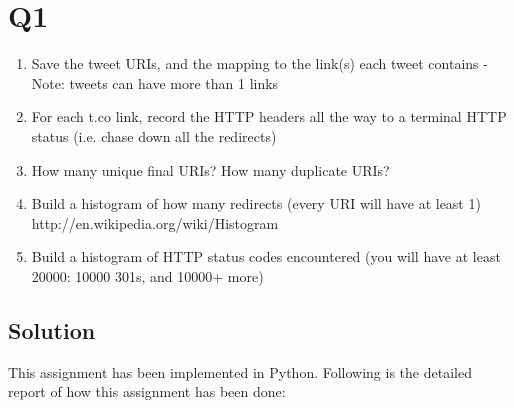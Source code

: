  


\section{Q1}
\label{part1}
\begin{enumerate}


\item Save the tweet URIs, and the mapping to the link(s) each tweet contains
- Note: tweets can have more than 1 links

\item For each t.co link, record the HTTP headers all the way to a terminal HTTP status (i.e. chase down all the redirects)

\item How many unique final URIs? How many duplicate URIs?

\item Build a histogram of how many redirects (every URI will have at least 1)
http://en.wikipedia.org/wiki/Histogram
 
\item Build a histogram of HTTP status codes encountered (you will have at least 20000: 10000 301s, and 10000+ more)


\end{enumerate}

\subsection{Solution}

This assignment has been implemented in Python. Following is the detailed report of how this assignment has been done:


